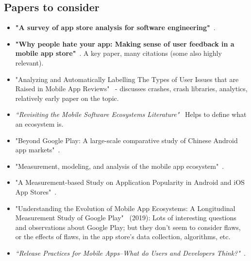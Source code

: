 \subsection{Papers to consider}
\begin{itemize}
    \item \textbf{"A survey of app store analysis for software engineering"}~\cite{martin2016survey}.
    
    \item \textbf{"Why people hate your app: Making sense of user feedback in a mobile app store"}~\cite{fu2013people}. A key paper, many citations (some also highly relevant).
    
    \item "Analyzing and Automatically Labelling The Types of User Issues that are Raised in Mobile App Reviews"~\cite{mcilroy2016analyzing} - discusses crashes, crash libraries, analytics, relatively early paper on the topic.
    
    \item \emph{``Revisiting the Mobile Software Ecosystems Literature"}~\cite{steglich2019revisiting} Helps to define what an ecosystem is.
    
    \item "Beyond Google Play: A large-scale comparative study of Chinese Android app markets"~\cite{wang2018beyond}.
    
    \item "Measurement, modeling, and analysis of the mobile app ecosystem"~\cite{petsas2017measurement}.
    
    \item "A Measurement-based Study on Application Popularity in Android and iOS App Stores"~\cite{liu2015measurement}.
    
    \item "Understanding the Evolution of Mobile App Ecosystems: A Longitudinal Measurement Study of Google Play"~\cite{wang2019understanding} (2019): Lots of interesting questions and observations about Google Play; but they don't seem to consider flaws, or the effects of flaws, in the app store's data collection, algorithms, etc.
    
    \item \emph{``Release Practices for Mobile Apps--What do Users and Developers Think?"}~\cite{nayebi2016release}.
    

\end{itemize}

